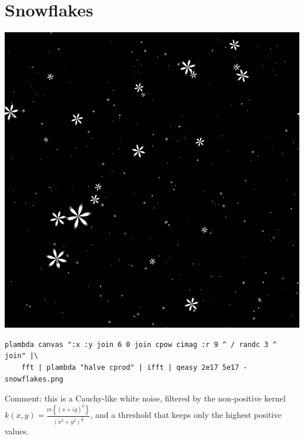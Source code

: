 \section{Snowflakes}
\includegraphics{snowflakes.png}
\begin{verbatim}
plambda canvas ":x :y join 6 0 join cpow cimag :r 9 ^ / randc 3 ^ join" |\
	fft | plambda "halve cprod" | ifft | qeasy 2e17 5e17 - snowflakes.png
\end{verbatim}
Comment: this is a Cauchy-like white noise, filtered by the non-positive
kernel~$k(x,y) =
\frac{\mathrm{re}\left\{(x+iy)^6\right\}}{(x^2+y^2)^\frac{9}{2}}$, and a
threshold that keeps only the highest positive values.


